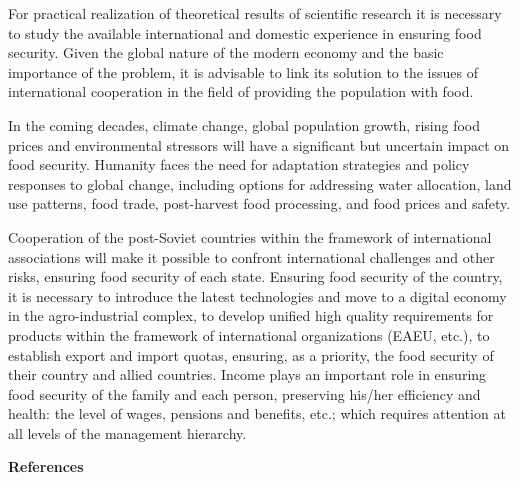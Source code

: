 \begin{multicols}{2}
For practical realization of theoretical results of scientific research
it is necessary to study the available international and domestic
experience in ensuring food security. Given the global nature of the
modern economy and the basic importance of the problem, it is advisable
to link its solution to the issues of international cooperation in the
field of providing the population with food.

In the coming decades, climate change, global population growth, rising
food prices and environmental stressors will have a significant but
uncertain impact on food security. Humanity faces the need for
adaptation strategies and policy responses to global change, including
options for addressing water allocation, land use patterns, food trade,
post-harvest food processing, and food prices and safety.

Cooperation of the post-Soviet countries within the framework of
international associations will make it possible to confront
international challenges and other risks, ensuring food security of each
state. Ensuring food security of the country, it is necessary to
introduce the latest technologies and move to a digital economy in the
agro-industrial complex, to develop unified high quality requirements
for products within the framework of international organizations (EAEU,
etc.), to establish export and import quotas, ensuring, as a priority,
the food security of their country and allied countries. Income plays an
important role in ensuring food security of the family and each person,
preserving his/her efficiency and health: the level of wages, pensions
and benefits, etc.; which requires attention at all levels of the
management hierarchy.
\end{multicols}

\begin{center}
{\bfseries References}
\end{center}

